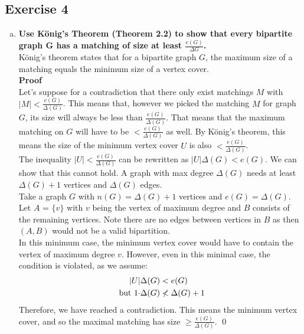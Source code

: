 \subsection*{Exercise 4}
\begin{enumerate}[a)]
\boldmath
    \item \textbf{Use König’s Theorem (Theorem 2.2) to show that every bipartite graph G has a matching of size at least $\frac{e(G)}{\Delta G}$.}
    \unboldmath \\
    \linebreak
    König's theorem states that for a bipartite graph $G$, the maximum size of a matching equals the minimum size of a vertex cover. \\
    \linebreak 
    \textbf{Proof}\\
    Let's suppose for a contradiction that there only exist matchings $M$ with $|M| < \frac{e(G)}{\Delta(G)}$. This means that, however we picked the matching $M$ for graph $G$, its size will always be less than $\frac{e(G)}{\Delta(G)}$. That means that the maximum matching on $G$ will have to be $< \frac{e(G)}{\Delta(G)}$ as well.
    By König's theorem, this means the size of the minimum vertex cover $U$ is also $< \frac{e(G)}{\Delta(G)}$. \\
    \linebreak
    The inequality $|U| < \frac{e(G)}{\Delta(G)}$ can be rewritten as $|U|\Delta(G) < e(G)$. We can show that this cannot hold. A graph with max degree $\Delta(G)$ needs at least $\Delta(G)+1$ vertices and $\Delta(G)$ edges. \\
    \linebreak 
    Take a graph $G$ with $n(G) = \Delta(G)+1$ vertices and $e(G) = \Delta(G)$. Let $A$ = $\{v\}$ with $v$ being the vertex of maximum degree and $B$ consists of the remaining vertices. Note there are no edges between vertices in $B$ as then $(A, B)$ would not be a valid bipartition. \\
    \linebreak 
    In this minimum case, the minimum vertex cover would have to contain the vertex of maximum degree $v$. However, even in this minimal case, the condition is violated, as we assume: 
    \begin{align}
    \notag
        |U| & \Delta(G) < e(G)\\
        \notag
        \text{ but } 1 \cdot & \Delta(G) \nless \Delta(G)+1 
    \end{align}
    Therefore, we have reached a contradiction. This means the minimum vertex cover, and so the maximal matching has size $\geq \frac{e(G)}{\Delta(G)}$. \qed

\end{enumerate}
